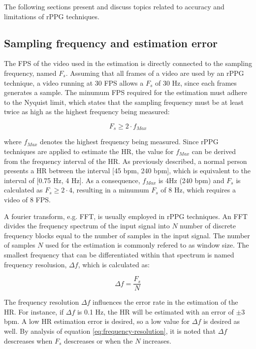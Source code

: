 The following sections present and discuss topics related to accuracy and limitations of rPPG techniques.

\subsection{Sampling frequency and estimation error}

The FPS of the video used in the estimation is directly connected to the sampling frequency, named $F_s$. Assuming that all frames of a video are used by an rPPG technique, a video running at 30 FPS allows a $F_s$ of 30 Hz, since each frames generates a sample. The minumum FPS required for the estimation must adhere to the Nyquist limit, which states that the sampling frequency must be at least twice as high as the highest frequency being measured:

\begin{equation*}
    F_s \geq 2 \cdot f_{Max}
\end{equation*}

where $f_{Max}$ denotes the highest frequency being measured. Since rPPG techniques are applied to estimate the HR, the value for $f_{Max}$ can be derived from the frequency interval of the HR. As previously described, a normal person presents a HR between the interval [45 bpm, 240 bpm], which is equivalent to the interval of [0.75 Hz, 4 Hz]. As a consequence, $f_{Max}$ is 4Hz (240 bpm) and $F_s$ is calculated as $F_s \geq 2 \cdot 4$, resulting in a minumum $F_s$ of 8 Hz, which requires a video of 8 FPS.

A fourier transform, e.g. FFT, is usually employed in rPPG techniques. An FFT divides the frequency spectrum of the input signal into $N$ number of discrete frequency blocks equal to the number of samples in the input signal. The number of samples $N$ used for the estimation is commonly refered to as window size. The smallest frequency that can be differentiated within that spectrum is named frequency resolusion, $\Delta f$, which is calculated as:

\begin{equation}
    \Delta f = \frac{F_s}{N}
    \label{eq:frequency-resolution}
\end{equation}

The frequency resolution $\Delta f$ influences the error rate in the estimation of the HR. For instance, if $\Delta f$ is 0.1 Hz, the HR will be estimated with an error of $\pm 3$ bpm. A low HR estimation error is desired, so a low value for $\Delta f$ is desired as well. By analysis of equation \ref{eq:frequency-resolution}, it is noted that $\Delta f$ descreases when $F_s$ descreases or when the $N$ increases.


